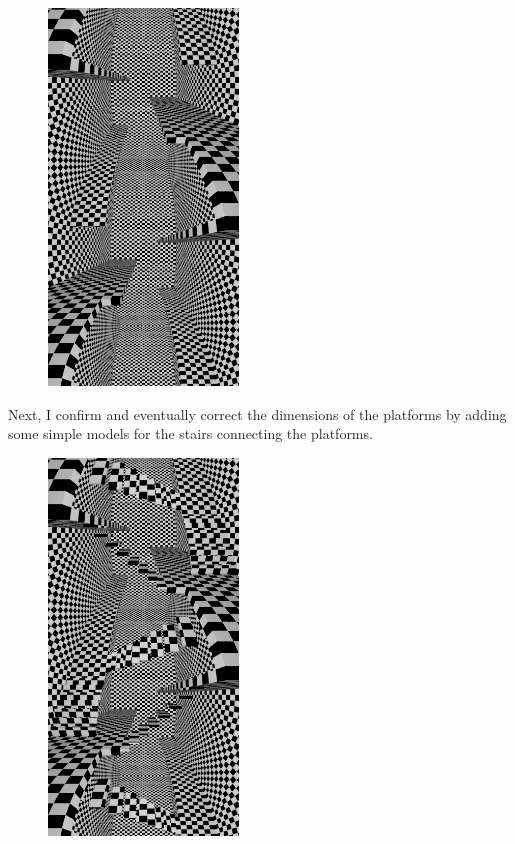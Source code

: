 \documentclass[12pt, a4paper]{article}
\begin{document}
\begin{center}
\begin{figure}[H]
\centering
\includegraphics[height=10cm]{./XL-51_8.png}\\
\end{figure}
\end{center}

Next, I confirm and eventually correct the dimensions of the platforms by adding some simple models for the stairs connecting the platforms.\\

\begin{scriptsize}
\begin{ttfamily}

\end{ttfamily}
\end{scriptsize}

\begin{center}
\begin{figure}[H]
\centering
\includegraphics[height=10cm]{./XL-51_9.png}\\
\end{figure}
\end{center}
\end{document}
